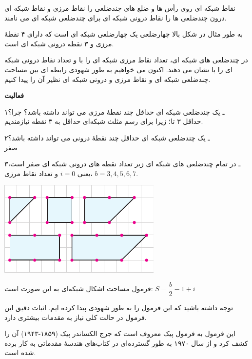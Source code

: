 \documentclass[12pt, a4paper]{book}
\begin{document}
نقاط شبکه ای روی رأس ها و ضلع های چندضلعی را نقاط مرزی و نقاط شبکه ای درون چندضلعی ها را نقاط درونی شبکه ای برای چندضلعی شبکه ای می نامند.

به طور مثال در شکل بالا چهارضلعی 
یک چهارضلعی شبکه ای است که دارای ۴ نقطهٔ مرزی و ٣ نقطه درونی شبکه ای است.
\bigskip

در چندضلعی های شبکه ای، تعداد نقاط مرزی شبکه ای را با
و تعداد نقاط درونی شبکه ای را با
نشان می دهند. اکنون می خواهیم به طور شهودی رابطه ای بین مساحت چندضلعی شبکه ای و نقاط مرزی و درونی شبکه ای نظیر آن را پیدا کنیم.
\bigskip

\textbf{فعالیت}

۱ـ یک چندضلعی شبکه ای حداقل چند نقطهٔ مرزی می تواند داشته باشد؟ چرا؟ \\
حداقل ۳ تا؛ زیرا برای رسم مثلث شبکه‌ای حداقل به ۳ نقطه نیازمندیم.




\begin{minipage}{0.68\textwidth}
	۲ـ یک چندضلعی شبکه ای حداقل چند نقطهٔ درونی می تواند داشته باشد؟ \\
	 صفر
	
	۳ـ در تمام چندضلعی های شبکه ای زیر تعداد نقطه های درونی شبکه ای صفر است، یعنی
	$i=0$
	و تعداد نقاط مرزی، 
	$b = 3 , 4, 5, 6 , 7$.
\end{minipage}   
\begin{minipage}{.32\textwidth}
	\begin{flushleft}
		\includegraphics{"Shapes/Fasl - 3/Dars 2/P70-S1.pdf"}
	\end{flushleft}
\end{minipage}

فرمول مساحت اشکال شبکه‌ای به این صورت است: 
$S = \dfrac{b}{2} -1 + i$

توجه داشته باشید که این فرمول را به طور شهودی پیدا کرده ایم. اثبات دقیق این فرمول در حالت کلی نیاز به مقدمات بیشتری دارد.

این فرمول به فرمول {\medium پیک} معروف است که جرج الکساندر پیک (۱۸۵۹-۱۹۴۳) آن را کشف کرد و از سال ۱۹۷۰ به طور گسترده‌ای در کتاب‌های هندسهٔ مقدماتی به کار برده شده است.
\end{document}

